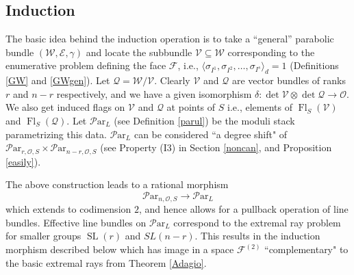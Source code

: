 \documentclass[11pt]{amsart}
\newcommand\mf{\mathcal{F}}
\newcommand\me{\mathcal{E}}
\newcommand\Fl{\operatorname{Fl}}
\newcommand\mv{\mathcal{V}}
\newcommand\tensor{\otimes}
\newcommand\mw{\mathcal{W}}
\newcommand\mq{\mathcal{Q}}
\newcommand\ParL{\mathcal{P}\text{ar}_L}
\newcommand\Par{\mathcal{P}\text{ar} }
\newcommand\SL{\operatorname{SL}}
\numberwithin{theorem}{subsection}
\begin{document}
\subsection{Induction}\label{schumann}
The basic idea behind the induction operation is to take a  ``general'' parabolic bundle $(\mw,\me,\gamma)$ and locate the subbundle $\mv\subseteq \mw$ corresponding to the enumerative problem  defining the face $\mf$, i.e., $\langle\sigma_{I^1}, \sigma_{I^2},\dots,\sigma_{I^s}\rangle_d= 1$ (Definitions \ref{GW}  and \ref{GWgen}). Let $\mq=\mw/\mv$. Clearly  $\mv$ and $\mq$ are vector bundles of ranks $r$ and $n-r$ respectively, and we have a given isomorphism $\delta:\det\mv \tensor\det\mq\to \mathcal{O}$. We also get induced flags on $\mv$ and $\mq$ at points of $S$ i.e., elements of  $ \Fl_S(\mv)$ and $\Fl_S(\mq)$.  Let $\ParL$ (see Definition \ref{parul}) be the moduli stack parametrizing this data.  $\ParL$ can be considered ``a  degree shift"  of  $\Par_{r,\mathcal{O},S}\times\Par_{n-r,\mathcal{O},S}$ (see Property (I3) in Section \ref{noncan}, and Proposition \ref{easily}).

The above construction leads to a rational morphism
$$\Par_{n,\mathcal{O},S}\to \ParL$$
which  extends to codimension $2$, and hence allows for a pullback operation of line bundles.
Effective line bundles on $\ParL$ correspond to  the extremal  ray problem for smaller groups $\SL(r)$ and $SL(n-r)$. This results in the induction morphism described below which has image in a space $\mf^{(2)}$ ``complementary" to the basic extremal rays from Theorem \ref{Adagio}.
\end{document}
